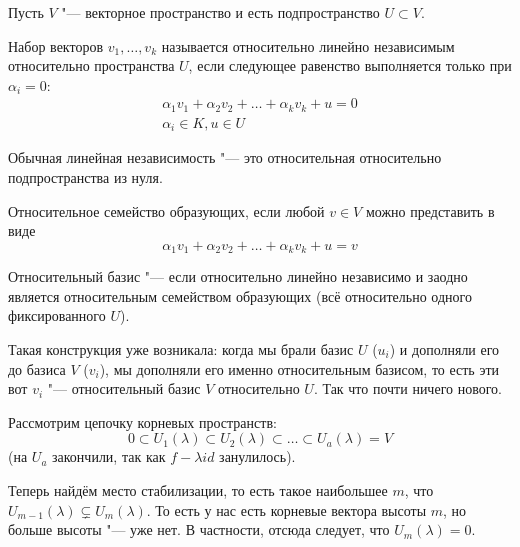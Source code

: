 Пусть $V$ "--- векторное пространство и есть подпространство $U \subset V$.
\begin{Def}
	Набор векторов $v_1, \dots, v_k$ называется относительно линейно независимым относительно пространства $U$,
	если следующее равенство выполняется только при $\alpha_i = 0$:
	\begin{gather*}
	\alpha_1 v_1 + \alpha_2 v_2 + \dots + \alpha_k v_k + u = 0 \\
	\alpha_i \in K, u \in U
	\end{gather*}
\end{Def}
\begin{Rem}
	Обычная линейная независимость "--- это относительная относительно подпространства из нуля.
\end{Rem}
\begin{Def}
	Относительное семейство образующих, если любой $v \in V$ можно представить в виде
	\[ \alpha_1 v_1 + \alpha_2 v_2 + \dots + \alpha_k v_k + u = v\]
\end{Def}
\begin{Def}
	Относительный базис "--- если относительно линейно независимо и заодно является относительным семейством образующих
	(всё относительно одного фиксированного $U$).
\end{Def}
\begin{Rem}
	Такая конструкция уже возникала: когда мы брали базис $U$ ($u_i$) и дополняли его до базиса $V$ ($v_i$), мы дополняли его именно относительным базисом,
	то есть эти вот $v_i$ "--- относительный базис $V$ относительно $U$.
	Так что почти ничего нового.
\end{Rem}

Рассмотрим цепочку корневых пространств:
\[ {0} \subset U_1(\lambda) \subset U_2(\lambda) \subset \dots \subset U_a(\lambda) = V \]
(на $U_a$ закончили, так как $f-\lambda id$ занулилось).

Теперь найдём место стабилизации, то есть
такое наибольшее $m$, что $U_{m-1}(\lambda) \subsetneq U_m(\lambda)$.
То есть у нас есть корневые вектора высоты $m$, но больше высоты "--- уже нет.
В частности, отсюда следует, что $U_m(\lambda) = 0$.

